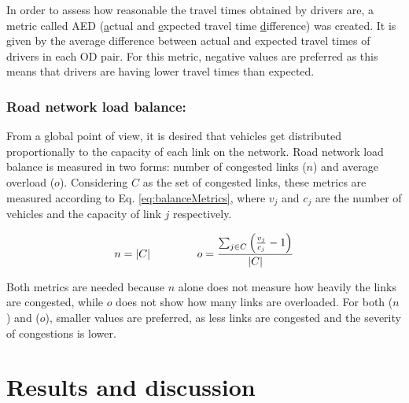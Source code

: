 \documentclass{RITA}
\newcommand{\linkCap}{\ensuremath{c_j}}		%
\newcommand{\veh}{\ensuremath{v}}		%
\newcommand{\congRoads}{\ensuremath{C}}		%
\newcommand{\numCong}{\ensuremath{n}}		%
\newcommand{\overLoadFactor}{\ensuremath{o}}	%
\begin{document}
In order to assess how reasonable the travel times obtained by drivers are, a metric called AED (\underline{a}ctual and \underline{e}xpected travel time \underline{d}ifference) was created. It is given by the average difference between actual and expected travel times of drivers in each OD pair. For this metric, negative values are preferred as this means that drivers are having lower travel times than expected. %

\subsubsection{Road network load balance:}
\label{sec:loadBalanceMetrics}
From a global point of view, it is desired that vehicles get distributed proportionally to the capacity of each link on the network. Road network load balance is measured in two forms: number of congested links ($n$) and average overload ($o$). Considering $C$ as the set of congested links, these metrics are measured according to Eq. \eqref{eq:balanceMetrics}, where $\veh_j$ and $\linkCap$ are the number of vehicles and the capacity of link $j$ respectively. 

\begin{equation}
\label{eq:balanceMetrics}
\numCong = |\congRoads| \hspace{1.5cm}  \overLoadFactor = \frac{ \sum_{\substack{j \in \congRoads}} \left(\frac{\veh_j}{\linkCap} -1 \right)}{|C|}
\end{equation}

Both metrics are needed because $n$ alone does not measure how heavily the links are congested, while $o$ does not show how many links are overloaded. For both ($n$) and ($o$), smaller values are preferred, as less links are congested and the severity of congestions is lower.

\section{Results and discussion}
\label{sec:results}
\end{document}
